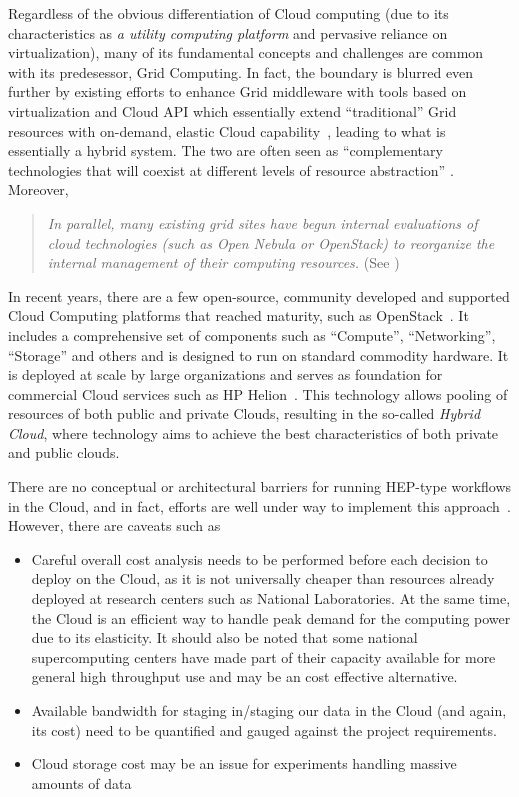 Regardless of the obvious differentiation of Cloud computing (due to its characteristics as \textit{a utility computing platform} and pervasive reliance on virtualization),
many of its fundamental concepts and challenges are common with its predesessor, Grid Computing. In fact, the boundary is blurred even further by existing efforts to
enhance Grid middleware with tools based on virtualization and Cloud API which essentially extend ``traditional'' Grid resources with on-demand, elastic Cloud
capability~\cite{star_acat11}, leading to what is essentially a hybrid system. The two are often seen as ``complementary technologies that will coexist at
different levels of resource abstraction'' \cite{atlas_cloud_chep13}. Moreover,
\begin{quote}
\textit{In parallel, many existing grid sites have begun internal evaluations of cloud technologies (such as Open Nebula or OpenStack) to reorganize the internal management of their computing resources.}
(See \cite{atlas_cloud_chep12})
\end{quote}

In recent years, there are a few open-source, community developed and supported Cloud Computing platforms that reached maturity, such as OpenStack~\cite{openstack}.
It includes a comprehensive set of components such as ``Compute'', ``Networking'', ``Storage'' and others and is designed to run on standard commodity hardware.
It is deployed at scale by large organizations and serves as foundation for commercial Cloud services such as HP Helion~\cite{helion}. This technology allows pooling
of resources of both public and private Clouds, resulting in the so-called \textit{Hybrid Cloud}, where technology aims to achieve the best characteristics of both private
and public clouds.

There are no conceptual or architectural barriers for running HEP-type workflows in the Cloud, and in fact, efforts are well under way to implement this
approach~\cite{atlas_cloud_chep12}. However, there are caveats such as
\begin{itemize}
\item Careful overall cost analysis needs to be performed before each decision to deploy on the Cloud, as it is not universally cheaper than
resources already deployed at research centers such as National Laboratories. At the same time, the Cloud is an efficient way to handle peak demand
for the computing power due to its elasticity. It should also be noted that some national supercomputing centers have made part of their 
capacity available for more general high throughput use and may be an cost effective alternative.
\item Available bandwidth for staging in/staging our data in the Cloud (and again, its cost) need to be quantified and gauged against the project requirements.
\item Cloud storage cost may be an issue for experiments handling massive amounts of data~\cite[p.~11]{atlas_cloud_chep12}
\end{itemize}

